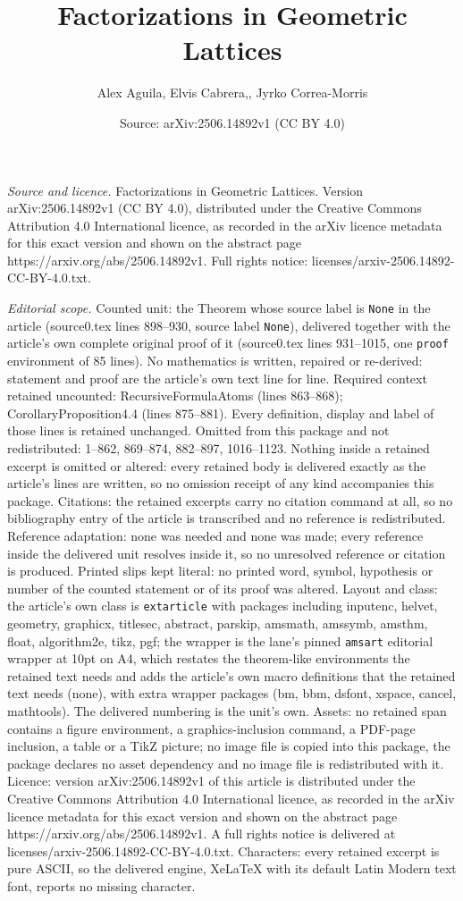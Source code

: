 \documentclass[10pt,a4paper]{amsart}
\title[Factorizations in Geometric Lattices]{Factorizations in Geometric Lattices}
\author{Alex Aguila, Elvis Cabrera,, Jyrko Correa-Morris}
\date{Source: arXiv:2506.14892v1 (CC BY 4.0)}
\begin{document}
\maketitle

\noindent\emph{Source and licence.} Factorizations in Geometric Lattices. Version arXiv:2506.14892v1 (CC BY 4.0), distributed under the Creative Commons Attribution 4.0 International licence, as recorded in the arXiv licence metadata for this exact version and shown on the abstract page https://arxiv.org/abs/2506.14892v1. Full rights notice: licenses/arxiv-2506.14892-CC-BY-4.0.txt.\par\smallskip

\noindent\textit{Editorial scope.} Counted unit: the Theorem whose source label is \texttt{None} in the article (source0.tex lines 898--930, source label \texttt{None}), delivered together with the article's own complete original proof of it (source0.tex lines 931--1015, one \texttt{proof} environment of 85 lines). No mathematics is written, repaired or re-derived: statement and proof are the article's own text line for line. Required context retained uncounted: RecursiveFormulaAtoms (lines 863--868); CorollaryProposition4.4 (lines 875--881). Every definition, display and label of those lines is retained unchanged. Omitted from this package and not redistributed: 1--862, 869--874, 882--897, 1016--1123. Nothing inside a retained excerpt is omitted or altered: every retained body is delivered exactly as the article's lines are written, so no omission receipt of any kind accompanies this package. Citations: the retained excerpts carry no citation command at all, so no bibliography entry of the article is transcribed and no reference is redistributed. Reference adaptation: none was needed and none was made; every reference inside the delivered unit resolves inside it, so no unresolved reference or citation is produced. Printed slips kept literal: no printed word, symbol, hypothesis or number of the counted statement or of its proof was altered. Layout and class: the article's own class is \texttt{extarticle} with packages including inputenc, helvet, geometry, graphicx, titlesec, abstract, parskip, amsmath, amssymb, amsthm, float, algorithm2e, tikz, pgf; the wrapper is the lane's pinned \texttt{amsart} editorial wrapper at 10pt on A4, which restates the theorem-like environments the retained text needs and adds the article's own macro definitions that the retained text needs (none), with extra wrapper packages (bm, bbm, dsfont, xspace, cancel, mathtools). The delivered numbering is the unit's own. Assets: no retained span contains a figure environment, a graphics-inclusion command, a PDF-page inclusion, a table or a TikZ picture; no image file is copied into this package, the package declares no asset dependency and no image file is redistributed with it. Licence: version arXiv:2506.14892v1 of this article is distributed under the Creative Commons Attribution 4.0 International licence, as recorded in the arXiv licence metadata for this exact version and shown on the abstract page https://arxiv.org/abs/2506.14892v1. A full rights notice is delivered at licenses/arxiv-2506.14892-CC-BY-4.0.txt. Characters: every retained excerpt is pure ASCII, so the delivered engine, XeLaTeX with its default Latin Modern text font, reports no missing character.
\end{document}
